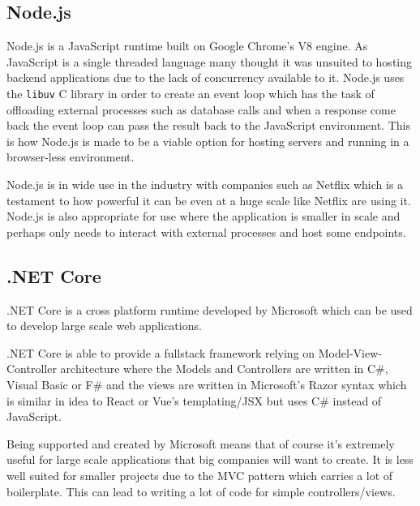 \subsection{Node.js}
Node.js \cite{nodejs} is a JavaScript runtime built on Google Chrome's V8 engine. As JavaScript is a single threaded language many thought it was unsuited to hosting backend applications due to the lack of concurrency available to it. Node.js uses the \texttt{libuv} C library \cite{libuv} in order to create an event loop which has the task of offloading external processes such as database calls and when a response come back the event loop can pass the result back to the JavaScript environment. This is how Node.js is made to be a viable option for hosting servers and running in a browser-less environment.

Node.js is in wide use in the industry with companies such as Netflix \cite{netflix-nodejs} which is a testament to how powerful it can be even at a huge scale like Netflix are using it. Node.js is also appropriate for use where the application is smaller in scale and perhaps only needs to interact with external processes and host some endpoints.

\subsection{.NET Core}

.NET Core \cite{.netcore} is a cross platform runtime developed by Microsoft which can be used to develop large scale web applications. 

.NET Core is able to provide a fullstack framework relying on Model-View-Controller architecture where the Models and Controllers are written in C\#, Visual Basic or F\# and the views are written in Microsoft's Razor syntax which is similar in idea to React or Vue's templating/JSX but uses C\# instead of JavaScript.

Being supported and created by Microsoft means that of course it's extremely useful for large scale applications that big companies will want to create. It is less well suited for smaller projects due to the MVC pattern which carries a lot of boilerplate. This can lead to writing a lot of code for simple controllers/views.

\pagebreak
